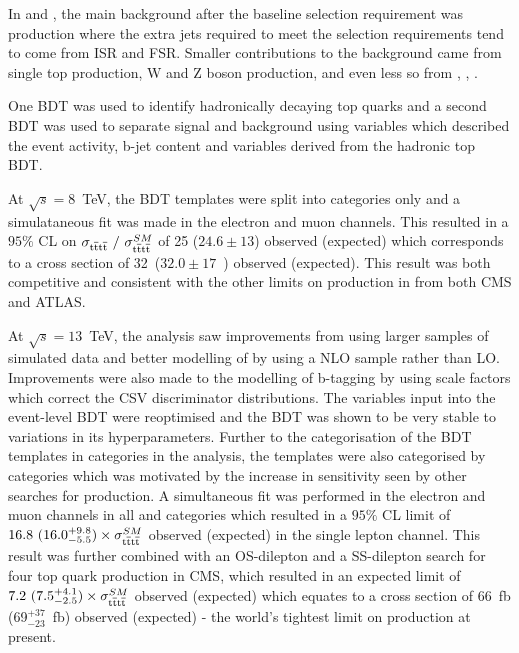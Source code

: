 In \runone and \runtwo, the main background after the baseline selection requirement was \ttbar production where the extra jets required to meet the selection requirements tend to come from ISR and FSR. Smaller contributions to the background came from single top production, W and Z boson production, and even less so from \ttH, \ttW, \ttZ. 

One BDT was used to identify hadronically decaying top quarks and a second BDT was used to separate signal and background using variables which described the event activity, b-jet content and variables derived from the hadronic top BDT.

At $\sqrt{s}=8$~TeV, the BDT templates were split into \njets categories only and a simulataneous fit was made in the electron and muon channels. This resulted in a $95\%$ CL on $\sigma_{{\mathrm{t}\overline{\mathrm{t}}\mathrm{t}\overline{\mathrm{t}}}}~/~\sigma_{{\mathrm{t}\overline{\mathrm{t}}\mathrm{t}\overline{\mathrm{t}}}}^{SM} $ of 25 ($24.6\pm13$) observed (expected) which corresponds to a cross section of 32~\fb ($32.0\pm17$~\fb) observed (expected). This result was both competitive and consistent with the other limits on \tttt production in \runone from both CMS and ATLAS.

At $\sqrt{s}=13$~TeV, the analysis saw improvements from using larger samples of simulated data and better modelling of \tttt by using a NLO sample rather than LO. Improvements were also made to the modelling of b-tagging by using scale factors which correct the CSV discriminator distributions.
The variables input into the event-level BDT were reoptimised and the BDT was shown to be very stable to variations in its hyperparameters. Further to the categorisation of the BDT templates in \njets categories in the \runone analysis, the templates were also categorised by \nMtags categories which was motivated by the increase in sensitivity seen by other searches for \tttt production. A simultaneous fit was performed in the electron and muon channels in all \njets and \nMtags categories which resulted in a $95\%$ CL limit of $16.8~(16.0^{+9.8}_{-5.5})\times \sigma_{{\mathrm{t}\overline{\mathrm{t}}\mathrm{t}\overline{\mathrm{t}}}}^{SM} $ observed (expected) in the single lepton channel. This result was further combined with an OS-dilepton and a SS-dilepton search for four top quark production in CMS, which resulted in an expected limit of $7.2~(7.5^{+4.1}_{-2.5})\times \sigma_{{\mathrm{t}\overline{\mathrm{t}}\mathrm{t}\overline{\mathrm{t}}}}^{SM} $ observed (expected) which equates to a cross section of 66~fb (69$^{+37}_{-23}$~fb) observed (expected) - the world's tightest limit on \tttt production at present.


